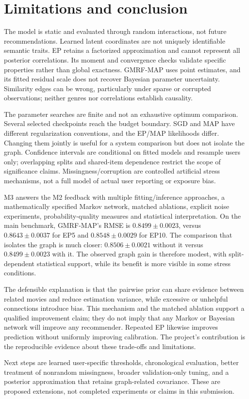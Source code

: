 \section{Limitations and conclusion}
The model is static and evaluated through random interactions, not future
recommendations. Learned latent coordinates are not uniquely identifiable
semantic traits. EP retains a factorized approximation and cannot represent
all posterior correlations. Its moment and convergence checks validate
specific properties rather than global exactness. GMRF-MAP uses point
estimates, and its fitted residual scale does not recover Bayesian parameter
uncertainty. Similarity edges can be wrong, particularly under sparse or
corrupted observations; neither genres nor correlations establish causality.

The parameter searches are finite and not an exhaustive optimum comparison.
Several selected checkpoints reach the budget boundary. SGD and MAP have
different regularization conventions, and the EP/MAP likelihoods differ.
Changing them jointly is useful for a system comparison but does not isolate
the graph. Confidence intervals are conditional on fitted models and resample
users only; overlapping splits and shared-item dependence restrict the scope
of significance claims. Missingness/corruption are controlled artificial stress
mechanisms, not a full model of actual user reporting or exposure bias.

M3 answers the M2 feedback with multiple fitting/inference approaches, a
mathematically specified Markov network, matched ablations, explicit noise
experiments, probability-quality measures and statistical interpretation.
On the main benchmark, GMRF-MAP's RMSE is $0.8499\pm0.0023$, versus
$0.8643\pm0.0037$ for EP5 and $0.8548\pm0.0029$ for EP10. The comparison that
isolates the graph is much closer: $0.8506\pm0.0021$ without it versus
$0.8499\pm0.0023$ with it. The observed graph gain is therefore modest,
with split-dependent statistical support, while its benefit is more visible
in some stress conditions.

The defensible explanation is that the pairwise prior can share evidence
between related movies and reduce estimation variance, while excessive or
unhelpful connections introduce bias. This mechanism and the matched ablation
support a qualified improvement claim; they do not imply that any Markov or
Bayesian network will improve any recommender. Repeated EP likewise improves
prediction without uniformly improving calibration. The project's contribution
is the reproducible evidence about these trade-offs and limitations.

Next steps are learned user-specific thresholds, chronological evaluation,
better treatment of nonrandom missingness, broader validation-only tuning,
and a posterior approximation that retains graph-related covariance. These
are proposed extensions, not completed experiments or claims in this submission.
